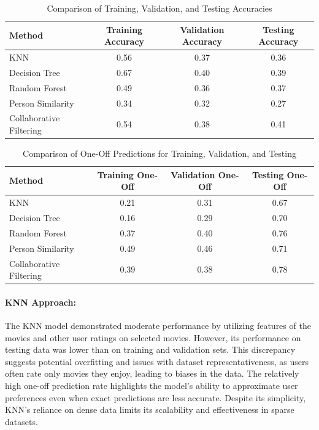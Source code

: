 \documentclass[a4paper,9pt]{article}
\begin{document}
\begin{table}[h]
    \centering
    \begin{tabular}{|l|c|c|c|}
        \hline
        \textbf{Method} & \textbf{Training Accuracy} & \textbf{Validation Accuracy} & \textbf{Testing Accuracy} \\ \hline
        KNN & 0.56 & 0.37 & 0.36 \\ \hline
        Decision Tree & 0.67 & 0.40 & 0.39 \\ \hline
        Random Forest & 0.49 & 0.36 & 0.37 \\ \hline
        Person Similarity & 0.34 & 0.32 & 0.27 \\ \hline
        Collaborative Filtering & 0.54 & 0.38 & 0.41 \\ \hline
    \end{tabular}
    \caption{Comparison of Training, Validation, and Testing Accuracies}
    \label{tab:comparison_accuracy}
\end{table}

\begin{table}[h]
    \centering
    \begin{tabular}{|l|c|c|c|}
        \hline
        \textbf{Method} & \textbf{Training One-Off} & \textbf{Validation One-Off} & \textbf{Testing One-Off} \\ \hline
        KNN & 0.21 & 0.31 & 0.67 \\ \hline
        Decision Tree & 0.16 & 0.29 & 0.70 \\ \hline
        Random Forest & 0.37 & 0.40 & 0.76 \\ \hline
        Person Similarity & 0.49 & 0.46 & 0.71 \\ \hline
        Collaborative Filtering & 0.39 & 0.38 & 0.78 \\ \hline
    \end{tabular}
    \caption{Comparison of One-Off Predictions for Training, Validation, and Testing}
    \label{tab:comparison_oneoff}
\end{table}

\paragraph{KNN Approach:}
The KNN model demonstrated moderate performance by utilizing features of the movies and other user ratings on selected movies.
However, its performance on testing data was lower than on training and validation sets.
This discrepancy suggests potential overfitting and issues with dataset representativeness, as users often rate only movies they enjoy, leading to biases in the data.
The relatively high one-off prediction rate highlights the model’s ability to approximate user preferences even when exact predictions are less accurate.
Despite its simplicity, KNN’s reliance on dense data limits its scalability and effectiveness in sparse datasets.
\end{document}
